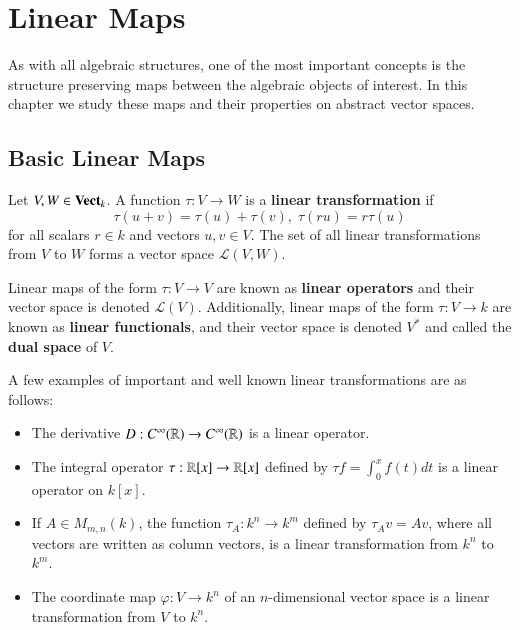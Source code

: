 \chapter{Linear Maps}\label{LinMaps}

As with all algebraic structures, one of the most important concepts is the structure preserving maps between the algebraic objects of interest. In this chapter we study these maps and their properties on abstract vector spaces.

\section{Basic Linear Maps}\label{sec:LinMaps}

\begin{definition}
    Let $V,W \in \normalfont\textbf{Vect}_{k}$. A function $\tau:V\rightarrow W$ is a \textbf{linear transformation} if \begin{equation*}
        \tau(u+v) = \tau(u)+\tau(v),\;\tau(ru) = r\tau(u)
    \end{equation*}
    for all scalars $r \in k$ and vectors $u,v \in V$. The set of all linear transformations from $V$ to $W$ forms a vector space $\mathcal{L}(V,W)$.
\end{definition}
Linear maps of the form $\tau:V\rightarrow V$ are known as \textbf{linear operators} and their vector space is denoted $\mathcal{L}(V)$. Additionally, linear maps of the form $\tau:V\rightarrow k$ are known as \textbf{linear functionals}, and their vector space is denoted $V^*$ and called the \textbf{dual space} of $V$. 

\begin{example}
    A few examples of important and well known linear transformations are as follows: \begin{itemize}
        \item The derivative $D:C^{\infty}(\mathbb R)\rightarrow C^{\infty}(\mathbb R)$ is a linear operator.
        \item The integral operator $\tau:\mathbb R[x]\rightarrow \mathbb R[x]$ defined by $\tau f = \int_0^xf(t)dt$ is a linear operator on $k[x]$.
        \item If $A \in M_{m,n}(k)$, the function $\tau_A:k^n\rightarrow k^m$ defined by $\tau_Av = Av$, where all vectors are written as column vectors, is a linear transformation from $k^n$ to $k^m$.
        \item The coordinate map $\varphi:V\rightarrow k^n$ of an $n$-dimensional vector space is a linear transformation from $V$ to $k^n$.
    \end{itemize}
\end{example}

